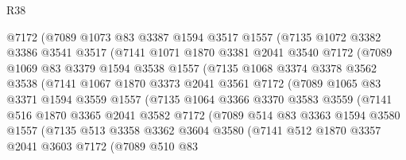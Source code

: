 \begin{lexlean}{R38}
\begin{coremodule}
            @7172
            (@7089
              @1073
              @83
              @3387
              @1594
              @3517
              @1557
              (@7135
                @1072
                @3382
                @3386
                @3541
                @3517
                (@7141
                  @1071
                  @1870
                  @3381
                  @2041
                  @3540
                  @7172
                  (@7089
                    @1069
                    @83
                    @3379
                    @1594
                    @3538
                    @1557
                    (@7135
                      @1068
                      @3374
                      @3378
                      @3562
                      @3538
                      (@7141
                        @1067
                        @1870
                        @3373
                        @2041
                        @3561
                        @7172
                        (@7089
                          @1065
                          @83
                          @3371
                          @1594
                          @3559
                          @1557
                          (@7135
                            @1064
                            @3366
                            @3370
                            @3583
                            @3559
                            (@7141
                              @516
                              @1870
                              @3365
                              @2041
                              @3582
                              @7172
                              (@7089
                                @514
                                @83
                                @3363
                                @1594
                                @3580
                                @1557
                                (@7135
                                  @513
                                  @3358
                                  @3362
                                  @3604
                                  @3580
                                  (@7141
                                    @512
                                    @1870
                                    @3357
                                    @2041
                                    @3603
                                    @7172
                                    (@7089
                                      @510
                                      @83

\end{coremodule}
\end{lexlean}
